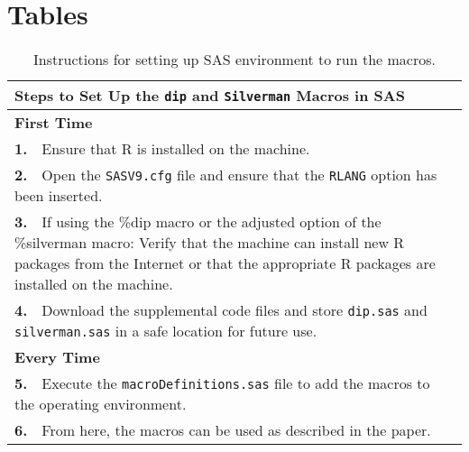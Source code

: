\documentclass[]{interact}
\theoremstyle{plain}%
\theoremstyle{definition}
\theoremstyle{remark}
\begin{document}
\clearpage
\section{Tables}
\begin{table}[h!]
\begin{tabularx}{\textwidth}{|X|}
\hline
\textbf{Steps to Set Up the \texttt{dip} and \texttt{Silverman} Macros in SAS} \\
\hline
\textbf{First Time} \\
{\textbf{1.}}~~Ensure that R is installed on the machine. \\
{\textbf{2.}}~~Open the \texttt{SASV9.cfg} file and ensure that the \texttt{RLANG} option has been inserted. \\
{\textbf{3.}}~~If using the \%dip macro or the adjusted option of the \%silverman macro: Verify that the machine can install new R packages from the Internet or that the appropriate R packages are installed on the machine. \\
{\textbf{4.}}~~Download the supplemental code files and store \texttt{dip.sas} and \texttt{silverman.sas} in a safe location for future use. \\
\hline
\textbf{Every Time} \\
{\textbf{5.}}~~Execute the \texttt{macroDefinitions.sas} file to add the macros to the operating environment. \\
{\textbf{6.}}~~From here, the macros can be used as described in the paper. \\%
\hline
\end{tabularx}
\caption{Instructions for setting up SAS environment to run the macros.\label{tab:setup}}
\end{table}

\clearpage
\end{document}
